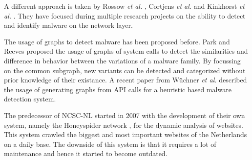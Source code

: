 A different approach is taken by Rossow \textit{et al.} \cite{Rossow2011}, Cortjens \textit{et al.} \cite{Cortjens2012} and Kinkhorst \textit{et al.} \cite{Kinkhorst2009}. They have focused during multiple research projects on the ability to detect and identify malware on the network layer.

The usage of graphs to detect malware has been proposed before. Park and Reeves proposed\cite{Park2011} the usage of graphs of system calls to detect the similarities and difference in behavior between the variations of a malware family. By focussing on the common subgraph, new variants can be detected and categorized without prior knowledge of their existance. A recent paper\cite{Wuchner2014} from W\"{u}chner \textit{et al.} described the usage of generating graphs from API calls for a heuristic based malware detection system.

The predecessor of NCSC-NL started in 2007 with the development of their own system, namely the Honeyspider network \cite{honeyspider}, for the dynamic analysis of websites. This system crawled the biggest and most important websites of the Netherlands on a daily base. The downside of this system is that it requires a lot of maintenance and hence it started to become outdated.

\iffalse
\subsection{Scope}

\todo{Zelfstandiger maken}

In this research project is an an algorithm created that allows multiple URLs to be opened at the same time while still being able to track all further interaction, such as unexpected HTTP requests and other malicious activity, and link them to the original request/URL. To prove that the algorithm is something feasible, a proof of concept of the algorithm has been implemented on top of the Cuckoo Sandbox.

The goal during this research project was to make the algorithm fully platform agnostic, however, several technical challenges prevented this. For this reason we limited our self to Windows 7 with version 8 of the Internet Explorer browser and have we the identified issues described.

The detection and identification of malicious behaviour was not part of this project. For our PoC we sticked to the detection of a well-known older and still to be determined malware family which existence is easy to detect on the system. 

\subsection{Ethical issues}

Our research contains no major ethical issues as it does not include working with personally identifiable information. Malware, if any, will be run in a controlled virtual environment. After every testrun the virtual machine will be automatically destroyed.

\fi
